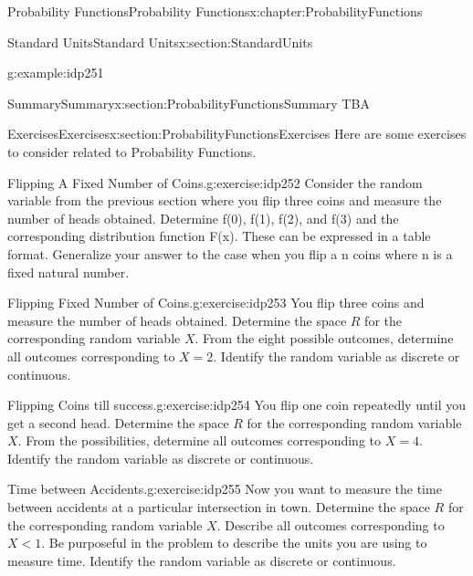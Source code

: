 \documentclass[oneside,10pt,]{book}
\numberwithin{equation}{section}
\newcommand{\lt}{<}
\begin{document}
\begin{chapterptx}{Probability Functions}{}{Probability Functions}{}{}{x:chapter:ProbabilityFunctions}
\begin{sectionptx}{Standard Units}{}{Standard Units}{}{}{x:section:StandardUnits}
\begin{example}{}{g:example:idp251}
\end{example}
%
\end{sectionptx}
%
%
\typeout{************************************************}
\typeout{************************************************}
%
\begin{sectionptx}{Summary}{}{Summary}{}{}{x:section:ProbabilityFunctionsSummary}
TBA%
\end{sectionptx}
%
%
\typeout{************************************************}
\typeout{************************************************}
%
\begin{sectionptx}{Exercises}{}{Exercises}{}{}{x:section:ProbabilityFunctionsExercises}
Here are some exercises to consider related to Probability Functions.%
\begin{inlineexercise}{Flipping A Fixed Number of Coins.}{g:exercise:idp252}%
Consider the random variable from the previous section where you flip three coins and measure the number of heads obtained. Determine f(0), f(1), f(2), and f(3) and the corresponding distribution function F(x). These can be expressed in a table format. Generalize your answer to the case when you flip a n coins where n is a fixed natural number.%
\end{inlineexercise}%
\begin{inlineexercise}{Flipping Fixed Number of Coins.}{g:exercise:idp253}%
You flip three coins and measure the number of heads obtained. Determine the space \(R\) for the corresponding random variable \(X\). From the eight possible outcomes, determine all outcomes corresponding to \(X = 2\). Identify the random variable as discrete or continuous.%
\end{inlineexercise}%
\begin{inlineexercise}{Flipping Coins till success.}{g:exercise:idp254}%
You flip one coin repeatedly until you get a second head. Determine the space \(R\) for the corresponding random variable \(X\). From the possibilities, determine all outcomes corresponding to \(X = 4\). Identify the random variable as discrete or continuous.%
\end{inlineexercise}%
\begin{inlineexercise}{Time between Accidents.}{g:exercise:idp255}%
Now you want to measure the time between accidents at a particular intersection in town. Determine the space \(R\) for the corresponding random variable \(X\). Describe all outcomes corresponding to \(X \lt 1\). Be purposeful in the problem to describe the units you are using to measure time. Identify the random variable as discrete or continuous.%
\end{inlineexercise}%
\end{sectionptx}
\end{chapterptx}
\end{document}
